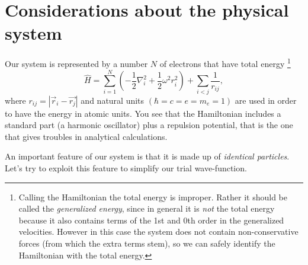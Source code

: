\section{Considerations about the physical system}
\label{sec:considerations}
Our system is represented by a number $N$ of electrons that have total energy
\footnote{
Calling the Hamiltonian the total energy is improper. Rather it should be called the \emph{generalized energy}, since in general it is \emph{not} the total energy because it also contains terms of the 1st and 0th order in the generalized velocities. However in this case the system does not contain non-conservative forces (from which the extra terms stem), so we can safely identify the Hamiltonian with the total energy.
}
\begin{equation}
	\hat{H} = 
	\sum_{i=1}^{N} \left( -\frac{1}{2}\nabla_i^2 + \frac{1}{2}\omega^2r_i^2 \right)
	+ \sum_{i<j}\frac{1}{r_{ij}},
	\label{eq:full_hamiltonian}
\end{equation}
where $r_{ij} = |\vec{r}_i - \vec{r_j}|$ and natural units $( \hbar = c = e = m_e = 1)$ are used in order to have the energy in atomic units. You see that the Hamiltonian includes a standard part (a harmonic oscillator) plus a repulsion potential, that is the one that gives troubles in analytical calculations.

An important feature of our system is that it is made up of \emph{identical particles}. Let's try to exploit this feature to simplify our trial wave-function.

